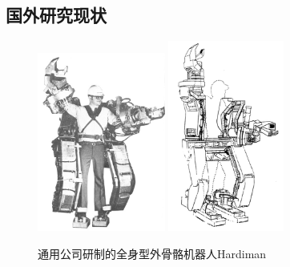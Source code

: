 \subsection{国外研究现状}
\begin{figure}[!h]
    \label{fig:sub1}{\includegraphics[width=4.2cm]{fig/f3_Hardiman.jpg}}\quad
    \label{fig:sub2}{\includegraphics[width=3.8cm]{fig/f4_Hardiman.jpg}}
    \caption{通用公司研制的全身型外骨骼机器人Hardiman\cite{p6}}
    \label{fig:subfigs}
\end{figure}

